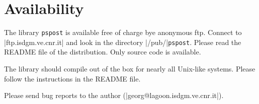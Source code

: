 \documentclass{article}
\newcommand{\psp}{{\tt pspost}}
\begin{document}
\section*{Availability}


The library \psp{} is available free of charge bye anonymous ftp.
Connect to
|ftp.isdgm.ve.cnr.it| and look in the directory |/pub/|\psp{}.
Please read the README file of the distribution. Only source code
is available.

The library should compile out of the box for nearly all Unix-like
systems. Please follow the instructions in the README file.

Please send bug reports to the author (|georg@lagoon.isdgm.ve.cnr.it|).


\newpage

\end{document}
